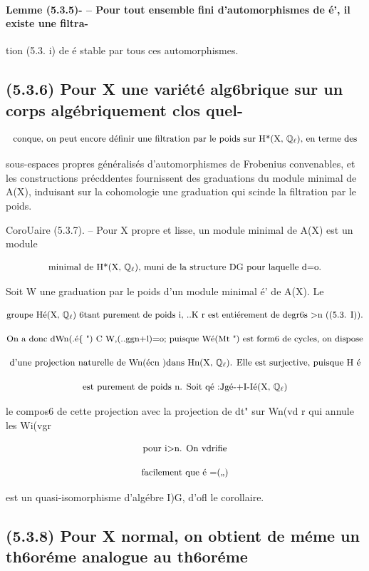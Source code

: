 \documentclass[11pt]{article}
\theoremstyle{remark}
\begin{document}
\paragraph{Lemme (5.3.5)- -- Pour tout ensemble fini d'automorphismes de é', il existe une filtra-}

tion (5.3. i) de é stable par tous ces automorphismes.

\subsection*{(5.3.6) Pour X une variété alg6brique sur un corps algébriquement clos quel-}

\[\text{\small conque, on peut encore définir une filtration par le poids sur H*(X, \(\mathbb{Q}_{\ell}\)), en terme des}\]

sous-espaces propres généralisés d'automorphismes de Frobenius convenables, et les constructions précddentes fournissent des graduations du module minimal de A(X), induisant sur la cohomologie une graduation qui scinde la filtration par le poids.

CoroUaire (5.3.7). -- Pour X propre et lisse, un module minimal de A(X) est un module

\[\text{\small minimal de H*(X, \(\mathbb{Q}_{\ell}\)), muni de la structure DG pour laquelle d=o.}\]

Soit W une graduation par le poids d'un module minimal é' de A(X). Le

\[\text{\small groupe Hé(X, \(\mathbb{Q}_{\ell}\)) 6tant purement de poids i, ..K r est entiérement de degr6s >n ((5.3. I)).}\]

\[\text{\small On a donc dWn(.é\{ ") C W,(..ggn+l)=o; puisque Wé(Mt ") est form6 de cycles, on dispose}\]

\[\text{\small d'une projection naturelle de Wn(écn )dans Hn(X, \(\mathbb{Q}_{\ell}\)). Elle est surjective, puisque H é}\]

\[\text{\small est purement de poids n. Soit qé :Jgé-+I-Ié(X, \(\mathbb{Q}_{\ell}\))}\]

le compos6 de cette projection avec la projection de dt" sur Wn(vd r qui annule les Wi(vgr

\[\text{\small pour i>n. On vdrifie}\]

\[\text{\small facilement que é =(,,)}\]

est un quasi-isomorphisme d'algébre I)G, d'ofl le corollaire.

\subsection*{(5.3.8) Pour X normal, on obtient de méme un th6oréme analogue au th6oréme}
\end{document}
